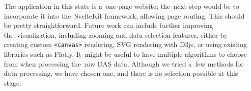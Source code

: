 


The application in this state is a~one-page website; the~next step would be to incorporate it into the~SvelteKit framework, allowing page routing. This should be pretty straightforward. Future work can include further improving the~visualization, including zooming and data selection features, either by creating custom \texttt{<canvas>} rendering, SVG rendering with D3js, or using existing libraries such as Plotly. It~might be useful to have multiple algorithms to choose from when processing the~raw DAS data. Although we tried a~few methods for data processing, we have chosen one, and there is no selection possible at this stage.






















